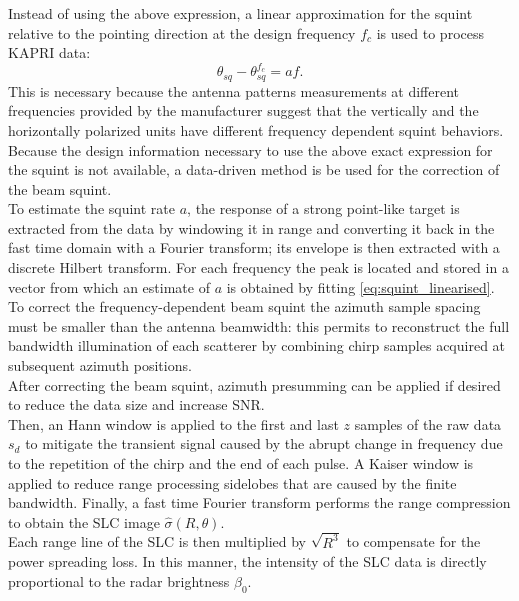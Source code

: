 Instead of using the above expression, a linear approximation for the squint relative to the pointing direction at the design frequency $f_c$ is used to process KAPRI data:
\begin{equation}\label{eq:squint_linearised}
	\theta_{sq} - \theta_{sq}^{f_{c}}  =  a f.
\end{equation}
This is necessary because the antenna patterns measurements at different frequencies provided by the manufacturer suggest that the vertically and the horizontally polarized units have different frequency dependent squint behaviors. Because the design information necessary to use the above exact expression for the squint is not available, a data-driven method is be used for the correction of the beam squint.\\ To estimate the squint rate $a$, the response of a strong point-like target is extracted from the data by windowing it in range and converting it back in the fast time domain with a Fourier transform; its envelope is then extracted with a discrete Hilbert transform. For each frequency the peak is located and stored in a vector from which an estimate of $a$ is obtained by fitting \eqref{eq:squint_linearised}.\\
To correct the frequency-dependent beam squint the azimuth sample spacing must be smaller than the antenna beamwidth: this permits to reconstruct the full bandwidth illumination of each scatterer by combining chirp samples acquired at subsequent azimuth positions.\\
After correcting the beam squint, azimuth presumming can be applied if desired to reduce the data size and increase SNR.\\ Then, an Hann window is applied to the first and last $z$ samples of the raw data $s_{d}$ to mitigate the transient signal caused by the abrupt change in frequency due to the repetition of the chirp and the end of each pulse. A Kaiser window is applied to reduce range processing sidelobes that are caused by the finite bandwidth. Finally, a fast time Fourier transform performs the range compression to obtain the SLC image $\hat{\sigma}\left(R, \theta\right)$.\\ Each range line of the SLC  is then multiplied by $\sqrt{R^3}$ to compensate for the power spreading loss. In this manner, the intensity of the SLC data is directly proportional to the radar brightness $\beta_{0}$\cite{Raney1994}. 
